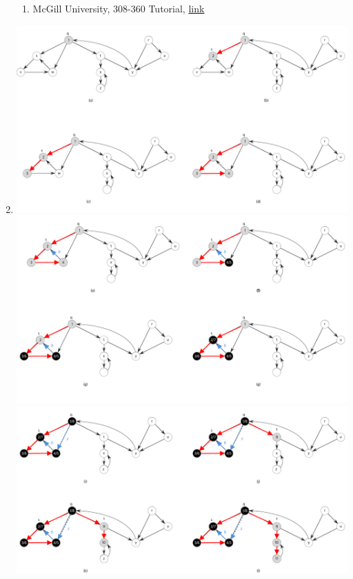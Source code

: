 \documentclass[12pt]{article}
\begin{document}
\begin{enumerate}[1.]
    \begin{enumerate}[1)]
        \item McGill University, 308-360 Tutorial, \href{https://www.cs.mcgill.ca/~kaleigh/teaching/360_tutorials/tutorial_02.html}{link}
    \end{enumerate}

    \item

    \bigskip

    \begin{center}
    \includegraphics[width=\linewidth]{images/worksheet_4_solution_21.png}
    \includegraphics[width=\linewidth]{images/worksheet_4_solution_22.png}
    \includegraphics[width=\linewidth]{images/worksheet_4_solution_26.png}

\end{center}
\end{enumerate}
\end{document}
